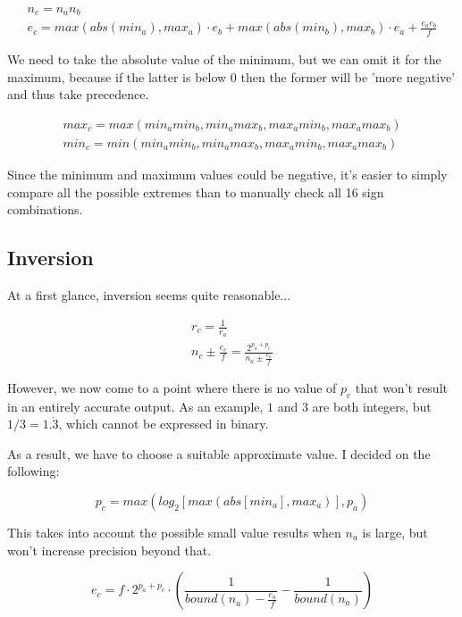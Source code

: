 \documentclass[10pt,a4paper]{article}
\numberwithin{equation}{section}
\numberwithin{equation}{subsection}
\begin{document}
	\begin{eqnarray}
		n_c = {n_a}{n_b} \\
		e_c = max(abs(min_a), max_a) \cdot e_b + max(abs(min_b), max_b) \cdot e_a + \frac{{e_a}{e_b}}{f}
	\end{eqnarray}
	
	We need to take the absolute value of the minimum, but we can omit it for the maximum, because if the latter is below 0 then the former will be 'more negative' and thus take precedence.
	
	\begin{eqnarray}
		max_c = max(min_a min_b, min_a max_b, max_a min_b, max_a max_b) \\
		min_c = min(min_a min_b, min_a max_b, max_a min_b, max_a max_b)
	\end{eqnarray}
	
	Since the minimum and maximum values could be negative, it's easier to simply compare all the possible extremes than to manually check all 16 sign combinations.
	
	\subsection{Inversion}
	
	At a first glance, inversion seems quite reasonable...
	
	\begin{eqnarray}
		r_c = \frac{1}{r_a} \\
		n_c \pm \frac{e_c}{f} = \frac{2^{p_a+p_c}}{n_a \pm \frac{e_a}{f}} 
	\end{eqnarray}
	
	However, we now come to a point where there is no value of $p_c$ that won't result in an entirely accurate output. As an example, $1$ and $3$ are both integers, but $1/3 = 1.\dot{3}$, which cannot be expressed in binary.
	
	As a result, we have to choose a suitable approximate value. I decided on the following:
	
	\begin{equation}
		p_c = max(log_2[max(abs[min_a], max_a)], p_a)
	\end{equation}
	
	This takes into account the possible small value results when $n_a$ is large, but won't increase precision beyond that.
	
	\begin{equation}
		e_c = f\cdot 2^{p_a+p_c}\cdot \left(\frac{1}{bound(n_a) - \frac{e_a}{f}} - \frac{1}{bound(n_a)}\right)
	\end{equation}
	
\end{document}
